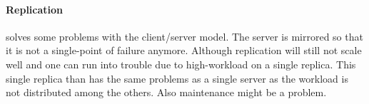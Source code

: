 \paragraph{Replication} %
\label{par:replication}
solves some problems with the client/server model.
The server is mirrored so that it is not a single-point of failure anymore.
Although replication will still not scale well
and one can run into trouble due to high-workload on a single replica.
This single replica than has the same problems as a single server
as the workload is not distributed among the others.
Also maintenance might be a problem.



